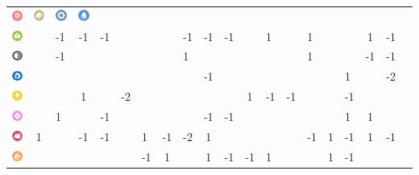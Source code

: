 \begin{table}[h]
\begin{center}
\begin{tabular}{c c g c g c g c g c g c g c g c g c g c}
    \includegraphics[width=1em]{images/psychic.png} &
    \includegraphics[width=1em]{images/rock.png} &
    \includegraphics[width=1em]{images/steel.png} &
    \includegraphics[width=1em]{images/water.png} &
    \\
    \includegraphics[width=1em]{images/bug.png} & & -1 & -1 & -1 & & & & -1 & -1 & -1 & & 1 & & 1 & & & 1 & -1 \\ %
    \includegraphics[width=1em]{images/dark.png} & & -1 & & & & & & 1 & & & & & & 1 & & & -1 & -1 \\ %
    \includegraphics[width=1em]{images/dragon.png} & & & & & & & & & -1 & & & & & & & 1 & & -2 \\ %
    \includegraphics[width=1em]{images/electric.png} & & & 1 & & -2 & & & & & & 1 & -1 & -1 & & & -1 & & \\ %
    \includegraphics[width=1em]{images/fairy.png} & & 1 & & -1 & & & & & -1 & -1 & & & & & & 1 & 1 & \\ %
    \includegraphics[width=1em]{images/fighting.png} & 1 & & -1 & -1 & & 1 & -1 & -2 & 1 & & & & & -1 & 1 & -1 & 1 & -1 \\ %
    \includegraphics[width=1em]{images/fire.png} & & & & & & -1 & 1 & & 1 & -1 & -1 & 1 & & & 1 & -1 & & \\ %

\end{tabular}
\end{center}
\end{table}
